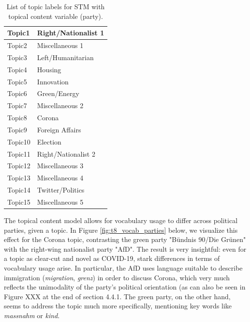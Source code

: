 \begin{table}[h!]
	\centering
	\captionsetup{justification=centering,margin=2cm}
	\begin{tabular}{|l|l|}
	\hline
	Topic1  & Right/Nationalist 1  \\ \hline
	Topic2  & Miscellaneous 1      \\ \hline
	Topic3  & Left/Humanitarian    \\ \hline
	Topic4  & Housing       	   \\ \hline
	Topic5  & Innovation           \\ \hline
	Topic6  & Green/Energy         \\ \hline
	Topic7  & Miscellaneous 2      \\ \hline
	Topic8  & Corona               \\ \hline
	Topic9  & Foreign Affairs      \\ \hline
	Topic10 & Election             \\ \hline
	Topic11 & Right/Nationalist 2  \\ \hline
	Topic12 & Miscellaneous 3      \\ \hline
	Topic13 & Miscellaneous 4      \\ \hline
	Topic14 & Twitter/Politics     \\ \hline
	Topic15 & Miscellaneous 5      \\ \hline
	\end{tabular}
	\caption{List of topic labels for STM with topical content variable (party).}
	\label{Tab:labels_content}
\end{table}

The topical content model allows for vocabulary usage to differ across political parties, given a topic. In Figure \ref{fig:t8_vocab_parties} below, we visualize this effect for the Corona topic, contrasting the green party "Bündnis 90/Die Grünen" with the right-wing nationalist party "AfD". The result is very insightful: even for a topic as clear-cut and novel as COVID-19, stark differences in terms of vocabulary usage arise. In particular, the AfD uses language suitable to describe immigration (\textit{migration}, \textit{grenz}) in order to discuss Corona, which very much reflects the unimodality of the party's political orientation (as can also be seen in Figure XXX at the end of section 4.4.1. The green party, on the other hand, seems to address the topic much more specifically, mentioning key words like \textit{massnahm} or \textit{kind}.

